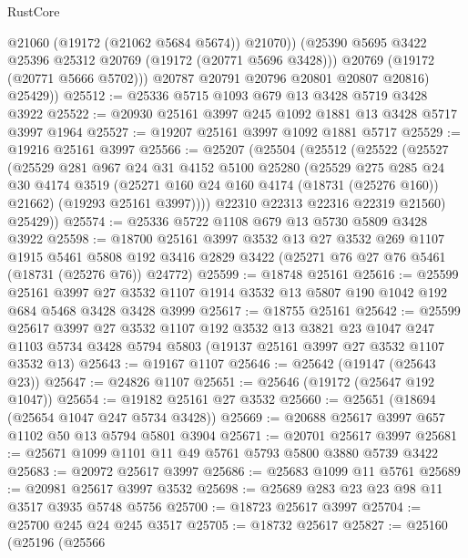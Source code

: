 \begin{lexlean}{RustCore}
\begin{coremodule}
                @21060
                (@19172 (@21062 @5684 @5674))
                @21070))
            (@25390 @5695 @3422 @25396 @25312 @20769 (@19172 (@20771 @5696 @3428)))
            @20769
            (@19172 (@20771 @5666 @5702)))
          @20787
          @20791
          @20796
          @20801
          @20807
          @20816)
        @25429))
@25512 := @25336 @5715 @1093 @679 @13 @3428 @5719 @3428 @3922
@25522 := @20930 @25161 @3997 @245 @1092 @1881 @13 @3428 @5717 @3997 @1964
@25527 := @19207 @25161 @3997 @1092 @1881 @5717
@25529 := @19216 @25161 @3997
@25566 := @25207
    (@25504
      (@25512
        (@25522
          (@25527
            (@25529
              @281
              @967
              @24
              @31
              @4152
              @5100
              @25280
              (@25529
                @275
                @285
                @24
                @30
                @4174
                @3519
                (@25271 @160 @24 @160 @4174 (@18731 (@25276 @160)) @21662)
                (@19293 @25161 @3997))))
          @22310
          @22313
          @22316
          @22319
          @21560)
        @25429))
@25574 := @25336 @5722 @1108 @679 @13 @5730 @5809 @3428 @3922
@25598 := @18700
    @25161
    @3997
    @3532
    @13
    @27
    @3532
    @269
    @1107
    @1915
    @5461
    @5808
    @192
    @3416
    @2829
    @3422
    (@25271 @76 @27 @76 @5461 (@18731 (@25276 @76)) @24772)
@25599 := @18748 @25161
@25616 := @25599
    @25161
    @3997
    @27
    @3532
    @1107
    @1914
    @3532
    @13
    @5807
    @190
    @1042
    @192
    @684
    @5468
    @3428
    @3428
    @3999
@25617 := @18755 @25161
@25642 := @25599
    @25617
    @3997
    @27
    @3532
    @1107
    @192
    @3532
    @13
    @3821
    @23
    @1047
    @247
    @1103
    @5734
    @3428
    @5794
    @5803
    (@19137 @25161 @3997 @27 @3532 @1107 @3532 @13)
@25643 := @19167 @1107
@25646 := @25642 (@19147 (@25643 @23))
@25647 := @24826 @1107
@25651 := @25646 (@19172 (@25647 @192 @1047))
@25654 := @19182 @25161 @27 @3532
@25660 := @25651 (@18694 (@25654 @1047 @247 @5734 @3428))
@25669 := @20688 @25617 @3997 @657 @1102 @50 @13 @5794 @5801 @3904
@25671 := @20701 @25617 @3997
@25681 := @25671 @1099 @1101 @11 @49 @5761 @5793 @5800 @3880 @5739 @3422
@25683 := @20972 @25617 @3997
@25686 := @25683 @1099 @11 @5761
@25689 := @20981 @25617 @3997 @3532
@25698 := @25689 @283 @23 @23 @98 @11 @3517 @3935 @5748 @5756
@25700 := @18723 @25617 @3997
@25704 := @25700 @245 @24 @245 @3517
@25705 := @18732 @25617
@25827 := @25160
    (@25196
      (@25566

\end{coremodule}
\end{lexlean}
